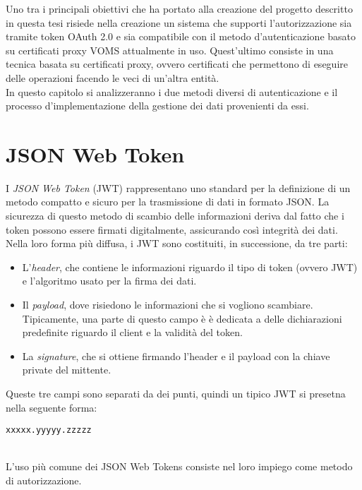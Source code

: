 Uno tra i principali obiettivi che ha portato alla creazione del progetto descritto in questa tesi 
risiede nella creazione un sistema che supporti 
l'autorizzazione sia tramite token OAuth 2.0 e sia compatibile con il metodo d'autenticazione basato su certificati proxy VOMS attualmente in uso.  
Quest'ultimo consiste in una tecnica basata su certificati proxy, ovvero certificati che permettono di eseguire delle operazioni facendo le veci di un'altra entità. 
\\ In questo capitolo si analizzeranno i due metodi diversi di autenticazione e il processo d'implementazione della gestione 
dei dati provenienti da essi.

\section{JSON Web Token}
I \textit{JSON Web Token} (JWT) \cite{JWT_rfc} rappresentano uno standard per la definizione di un metodo 
compatto e sicuro per la trasmissione di dati in formato JSON. La sicurezza di questo metodo di scambio delle 
informazioni deriva dal fatto che i token possono essere firmati digitalmente, assicurando così integrità dei dati.  
\\ Nella loro forma più diffusa, i JWT sono costituiti, in successione, da tre parti:
\begin{itemize}
    \item L'\textit{header}, che contiene le informazioni riguardo il tipo di token (ovvero JWT) e 
    l'algoritmo usato per la firma dei dati. 
    \item Il \textit{payload}, dove risiedono le informazioni che si vogliono scambiare. Tipicamente, una parte di questo campo è 
    è dedicata a delle dichiarazioni predefinite riguardo il client e la validità del token. 
    \item La \textit{signature}, che si ottiene firmando l'header e il payload con la chiave private del mittente.
\end{itemize}
Queste tre campi sono separati da dei punti, quindi un tipico JWT si presetna nella seguente forma:
\\ \centerline{\texttt{xxxxx.yyyyy.zzzzz}}
\\ L'uso più comune dei JSON Web Tokens consiste nel loro impiego come metodo di autorizzazione.

